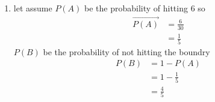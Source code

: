\renewcommand{\theequation}{\theenumi}
\begin{enumerate}[label=\arabic*.,ref=\thesubsection.\theenumi]
\item let assume $P\left(A\right)$ be the probability of hitting 6 so
\begin{align}
\vec {P\left(A\right)} &= \frac{6}{30}
\\
&= \frac{1}{5}
\end{align}
$P\left(B\right)$ be the probability of not hitting the boundry
\begin{align}
P\left(B\right) &= 1 - P\left(A\right)
\\
&= 1-\frac{1}{5}
\\
&= \frac{4}{5}
\end{align}
\end{enumerate}